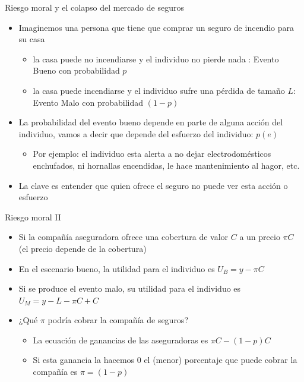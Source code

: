 \documentclass{beamer}
\begin{document}
\begin{frame}{Riesgo moral y el colapso del mercado de seguros}
 \begin{itemize}
    \item Imaginemos una persona que tiene que comprar un seguro de incendio para su casa
    \begin{itemize}
    \item la casa puede no incendiarse y el individuo no pierde nada : Evento Bueno con probabilidad $p$
    \item la casa puede incendiarse y el individuo sufre una pérdida de tamaño $L$: Evento Malo con probabilidad $(1-p)$ 
    \end{itemize}
    \vspace{1mm}
    \item La probabilidad del evento bueno depende en parte de alguna acción del individuo, vamos a decir que depende del esfuerzo del individuo: $p(e)$
    \begin{itemize}
    \item Por ejemplo: el individuo esta alerta a no dejar electrodomésticos enchufados, ni hornallas encendidas, le hace mantenimiento al hagor, etc.
    \end{itemize}
    \item La clave es entender que quien ofrece el seguro no puede ver esta acción o esfuerzo
\end{itemize}
\end{frame}

\begin{frame}{Riesgo moral II}
    \begin{itemize}
    \item Si la compañía aseguradora ofrece una cobertura de valor $C$ a un precio $\pi C$ (el precio depende de la cobertura) \vspace{2mm}
    \item En el escenario bueno, la utilidad para el individuo es 
    $U_B = y - \pi C$
    \item Si se produce el evento malo, su utilidad para el individuo es 
    $U_M = y - L - \pi C + C$ \vspace{2mm}
    \item ¿Qué $\pi$ podría cobrar la compañía de seguros?
    \begin{itemize}
    \item La ecuación de ganancias de las aseguradoras es  
    $\pi C - (1-p) C$
    \item Si esta ganancia la hacemos $0$ el (menor) porcentaje que puede cobrar la compañía es $\pi=(1-p)$
    \end{itemize}
    \end{itemize}
\end{frame}
\end{document}
